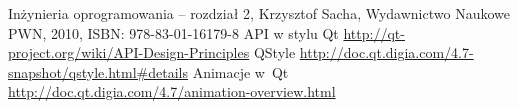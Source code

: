 \documentclass[11pt,twoside,a4paper,final]{article}
\begin{document}





\begin{thebibliography}{}
Inżynieria oprogramowania -- rozdział 2, Krzysztof Sacha, Wydawnictwo Naukowe PWN, 2010, ISBN: 978-83-01-16179-8
API w stylu Qt \url{http://qt-project.org/wiki/API-Design-Principles}
QStyle \url{http://doc.qt.digia.com/4.7-snapshot/qstyle.html#details}
Animacje w~Qt \url{http://doc.qt.digia.com/4.7/animation-overview.html}


\end{thebibliography}
\end{document}
